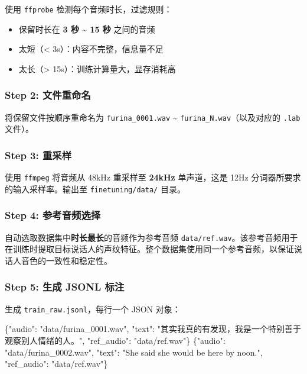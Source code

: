 \documentclass[
  english,
  letterpaper,
  DIV=11,
  numbers=noendperiod]{scrartcl}
\newenvironment{Shaded}{\begin{snugshade}}{\end{snugshade}}
\newcommand{\DataTypeTok}[1]{\textcolor[rgb]{0.68,0.00,0.00}{#1}}
\newcommand{\FunctionTok}[1]{\textcolor[rgb]{0.28,0.35,0.67}{#1}}
\newcommand{\StringTok}[1]{\textcolor[rgb]{0.13,0.47,0.30}{#1}}
\providecommand{\tightlist}{%
  \setlength{\itemsep}{0pt}\setlength{\parskip}{0pt}}
\begin{document}
使用 \texttt{ffprobe} 检测每个音频时长，过滤规则：

\begin{itemize}
\tightlist
\item
  保留时长在 \textbf{3 秒 \textasciitilde{} 15 秒} 之间的音频
\item
  太短（\textless{} 3s）：内容不完整，信息量不足
\item
  太长（\textgreater{} 15s）：训练计算量大，显存消耗高
\end{itemize}

\subsubsection{Step 2:
文件重命名}\label{step-2-ux6587ux4ef6ux91cdux547dux540d}

将保留文件按顺序重命名为 \texttt{furina\_0001.wav} \textasciitilde{}
\texttt{furina\_N.wav}（以及对应的 \texttt{.lab} 文件）。

\subsubsection{Step 3: 重采样}\label{step-3-ux91cdux91c7ux6837}

使用 \texttt{ffmpeg} 将音频从 48kHz 重采样至 \textbf{24kHz} 单声道，这是
12Hz 分词器所要求的输入采样率。输出至 \texttt{finetuning/data/} 目录。

\subsubsection{Step 4:
参考音频选择}\label{step-4-ux53c2ux8003ux97f3ux9891ux9009ux62e9}

自动选取数据集中\textbf{时长最长}的音频作为参考音频
\texttt{data/ref.wav}。该参考音频用于在训练时提取目标说话人的声纹特征。整个数据集使用同一个参考音频，以保证说话人音色的一致性和稳定性。

\subsubsection{Step 5: 生成 JSONL
标注}\label{step-5-ux751fux6210-jsonl-ux6807ux6ce8}

生成 \texttt{train\_raw.jsonl}，每行一个 JSON 对象：

\begin{Shaded}
\begin{Highlighting}[]
\FunctionTok{\{}\DataTypeTok{"audio"}\FunctionTok{:} \StringTok{"data/furina\_0001.wav"}\FunctionTok{,} \DataTypeTok{"text"}\FunctionTok{:} \StringTok{"其实我真的有发现，我是一个特别善于观察别人情绪的人。"}\FunctionTok{,} \DataTypeTok{"ref\_audio"}\FunctionTok{:} \StringTok{"data/ref.wav"}\FunctionTok{\}}
\FunctionTok{\{}\DataTypeTok{"audio"}\FunctionTok{:} \StringTok{"data/furina\_0002.wav"}\FunctionTok{,} \DataTypeTok{"text"}\FunctionTok{:} \StringTok{"She said she would be here by noon."}\FunctionTok{,} \DataTypeTok{"ref\_audio"}\FunctionTok{:} \StringTok{"data/ref.wav"}\FunctionTok{\}}
\end{Highlighting}
\end{Shaded}
\end{document}
